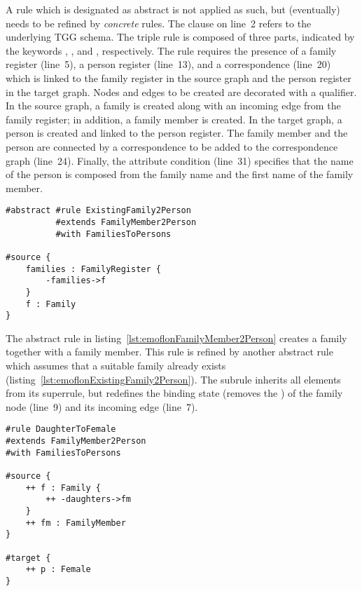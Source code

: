 A rule which is designated as abstract is not applied as such, but (eventually) needs to be refined by \emph{concrete} rules.
The  clause on line~2 refers to the underlying TGG schema.
The triple rule is composed of three parts, indicated by the keywords , , and , respectively. The rule requires the presence of a family register (line~5), a person register (line~13), and a correspondence (line~20) which is linked to the family register in the source graph and the person register in the target graph. Nodes and edges to be created are decorated with a \code{++} qualifier. In the source graph, a family is created along with an incoming edge from the family register; in addition, a family member is created. In the target graph, a person is created and linked to the person register. The family member and the person are connected by a correspondence to be added to the correspondence graph (line~24).
Finally, the attribute condition (line~31) specifies that the name of the person is composed from the family name and the first name of the family member.

\begin{lstlisting}[label={lst:emoflonExistingFamily2Person}, float=tb!, language=emoflon, caption={Mapping members in existing families to persons}]
#abstract #rule ExistingFamily2Person 
          #extends FamilyMember2Person 
          #with FamiliesToPersons

#source { 
    families : FamilyRegister {
        -families->f
    }
    f : Family
}
\end{lstlisting}

The abstract rule in listing~\ref{lst:emoflonFamilyMember2Person} creates a family together with a family member.
This rule is refined by another abstract rule which assumes that a suitable family already exists (listing~\ref{lst:emoflonExistingFamily2Person}).
The subrule inherits all elements from its superrule, but redefines the binding state (removes the \code{++}) of the family node (line~9) and its incoming edge (line~7).

\begin{lstlisting}[label={lst:emoflonDaughterToFemale}, float=tb!, language=emoflon, caption={Mapping daughters to female persons}]
#rule DaughterToFemale 
#extends FamilyMember2Person 
#with FamiliesToPersons

#source { 
    ++ f : Family {
        ++ -daughters->fm
    }
    ++ fm : FamilyMember
}

#target {
    ++ p : Female
}
\end{lstlisting}

